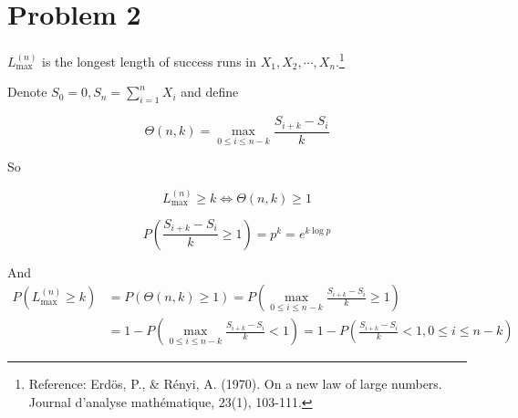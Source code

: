\documentclass{article}
\begin{document}
\section{Problem 2}
$L_{\max}^{(n)}$ is the longest length of success runs in $X_1,X_2,\cdots,X_n$.\footnote{Reference: Erdös, P., \& Rényi, A. (1970). On a new law of large numbers. Journal d’analyse mathématique, 23(1), 103-111.}

Denote $S_0 = 0,S_n = \sum\limits_{i=1}^n X_i $ and define 

\begin{equation}
    \Theta(n,k)  = \max_{0\leqslant i \leqslant n-k} \frac{S_{i+k}-S_{i}}{k}
\end{equation}

So 

\begin{equation}
    L_{\max}^{(n)} \geqslant k \Longleftrightarrow \Theta(n,k) \geqslant 1
\end{equation}




\begin{equation}
    P(\frac{S_{i+k}-S_{i}}{k}\geqslant 1) = p^k = e^{k\log p }
\end{equation}

And 
\begin{equation}
    \begin{aligned}
        P( L_{\max}^{(n)} \geqslant k) & = P(\Theta(n,k) \geqslant 1) = P\left(\max_{0\leqslant i \leqslant n-k} \frac{S_{i+k}-S_{i}}{k} \geqslant 1 \right)  \\
        &= 1- P\left(\max_{0\leqslant i \leqslant n-k} \frac{S_{i+k}-S_{i}}{k} < 1 \right) = 1- P\left(\frac{S_{i+k}-S_{i}}{k} < 1 , 0\leqslant i \leqslant n-k \right)
    \end{aligned}
\end{equation}
\end{document}
